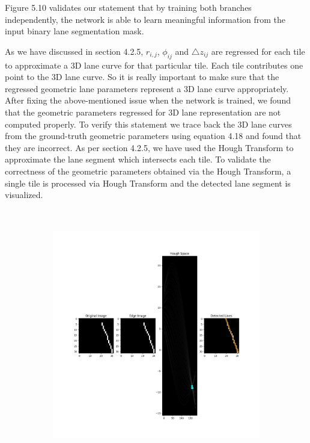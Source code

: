 \begin{figure}[h]
\begin{subfigure}{0.8\textwidth}
        \caption{}
        \label{fig:subim2}
        \end{subfigure}
        \end{figure}

Figure 5.10 validates our statement that by training both branches independently, the network is able to learn meaningful information from the input binary lane segmentation mask.

As we have discussed in section 4.2.5, $r_{i,j}$, $\phi_{ij}$ and $\triangle{z}_{ij}$ are regressed for each tile to approximate a 3D lane curve for that particular tile. Each tile contributes one point to the 3D lane curve. So it is really important to make sure that the regressed geometric lane parameters represent a 3D lane curve appropriately. After fixing the above-mentioned issue when the network is trained, we found that the geometric parameters regressed for 3D lane representation are not computed properly. To verify this statement we trace back the 3D lane curves from the ground-truth geometric parameters using equation 4.18 and found that they are incorrect. As per section 4.2.5, we have used the Hough Transform to approximate the lane segment which intersects each tile. To validate the correctness of the geometric parameters obtained via the Hough Transform, a single tile is processed via Hough Transform and the detected lane segment is visualized.

        \begin{figure}[h]
       \caption{Validating Hough Transform and visualizing the detected lane segment from a single tile}
        \centering
        \begin{subfigure}{0.8\textwidth}
        \includegraphics[width=1\linewidth, height=11cm]{images/hough_validation.jpg} 
        \label{fig:subim1}
        \end{subfigure}
        \end{figure}

